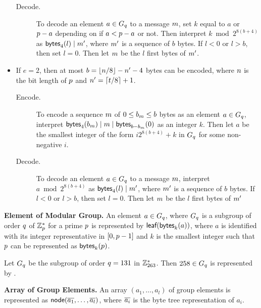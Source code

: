 \begin{itemize}
\begin{description}
    \item[Decode.] To decode an element $a\in G_{q}$ to a message
      $m$, set $k$ equal to $a$ or $p-a$ depending on if $a<p-a$
      or not. Then interpret $k\bmod 2^{8(b+4)}$ as
      $\textsf{bytes}_{4}(l)\mid m'$, where $m'$ is a sequence of $b$
      bytes. If $l<0$ or $l>b$, then set $l=0$. Then let $m$ be the
      $l$ first bytes of $m'$.

    \end{description}

  \item If $e=2$, then at most $b=\lfloor n/8\rfloor-n'-4$
    bytes can be encoded, where $n$ is the bit length of $p$ and
    $n'=\lceil t/8\rceil+1$.
    \begin{description}

    \item[Encode.] To encode a sequence $m$ of $0\leq
      b_{m}\leq b$ bytes as an element $a\in G_{q}$, interpret
      $\textsf{bytes}_{4}(b_{m})\mid m\mid\textsf{bytes}_{b-b_{m}}(0)$ as
      an integer $k$. Then let $a$ be the smallest integer of the form
      $i2^{8(b+4)}+k$ in $G_{q}$ for some non-negative $i$.

    \item[Decode.] To decode an element $a\in G_{q}$ to a message
      $m$, interpret $a\bmod 2^{8(b+4)}$ as
      $\textsf{bytes}_{4}(l)\mid m'$, where $m'$ is a sequence of $b$
      bytes. If $l<0$ or $l>b$, then set $l=0$. Then let $m$ be the
      $l$ first bytes of $m'$

    \end{description}

  \end{itemize}

\item\textbf{Element of Modular Group.} An element $a\in G_{q}$, where
  $G_{q}$ is a subgroup of order $q$ of $\mathbb{Z}_{p}^*$ for a prime $p$
  is represented by $\textsf{leaf}(\textsf{bytes}_{k}(a))$, where $a$ is identified
  with its integer representative in $[0,p-1]$ and $k$ is the
  smallest integer such that $p$ can be represented as
  $\textsf{bytes}_{k}(p)$.

  \begin{example}
    Let $G_{q}$ be the subgroup of order $q=131$ in
    $\mathbb{Z}_{263}^*$. Then $258\in G_{q}$ is represented by
    .
  \end{example}

\item\textbf{Array of Group Elements.} An array $(a_1,\ldots,a_l)$ of
  group elements is represented as $\textsf{node}(\overline{a_1},\ldots,\overline{a_l})$,
  where $\overline{a_i}$ is the byte tree representation of $a_i$.

